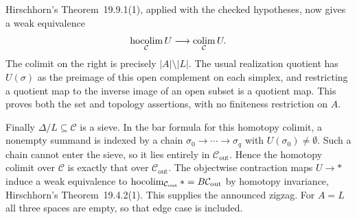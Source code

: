 Hirschhorn's Theorem~19.9.1(1), applied with the checked hypotheses,
now gives a weak equivalence
\[
 \operatorname*{hocolim}_{\mathcal C}U\longrightarrow\operatorname*{colim}_{\mathcal C}U.
\]
The colimit on the right is precisely $|A|\setminus|L|$.
The usual realization quotient has $U(\sigma)$ as the preimage
of this open complement on each simplex, and restricting a quotient
map to the inverse image of an open subset is a quotient map.
This proves both the set and topology assertions, with no finiteness
restriction on $A$.

Finally $\Delta/L\subseteq\mathcal C$ is a sieve.  In the bar
formula for this homotopy colimit, a nonempty summand is indexed
by a chain $\sigma_0\to\cdots\to\sigma_q$ with
$U(\sigma_0)\ne\emptyset$.  Such a chain cannot enter the sieve,
so it lies entirely in $\mathcal C_{\mathrm{out}}$.  Hence the
homotopy colimit over $\mathcal C$ is exactly that over
$\mathcal C_{\mathrm{out}}$.  The objectwise contraction maps
$U\to *$ induce a weak equivalence to
$\operatorname*{hocolim}_{\mathcal C_{\mathrm{out}}}*=B\mathcal C_{\mathrm{out}}$
by homotopy invariance, Hirschhorn's Theorem~19.4.2(1).
This supplies the announced zigzag.  For $A=L$ all three spaces
are empty, so that edge case is included.
